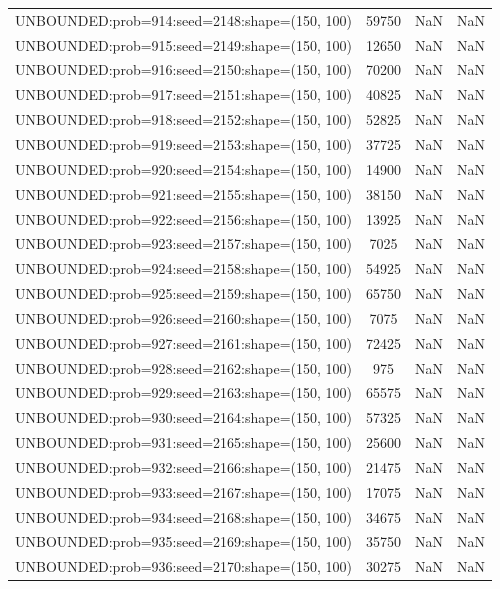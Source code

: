 \begin{longtable}{lccc}
UNBOUNDED:prob=914:seed=2148:shape=(150, 100) & 59750 &   NaN &    NaN \\
UNBOUNDED:prob=915:seed=2149:shape=(150, 100) & 12650 &   NaN &    NaN \\
UNBOUNDED:prob=916:seed=2150:shape=(150, 100) & 70200 &   NaN &    NaN \\
UNBOUNDED:prob=917:seed=2151:shape=(150, 100) & 40825 &   NaN &    NaN \\
UNBOUNDED:prob=918:seed=2152:shape=(150, 100) & 52825 &   NaN &    NaN \\
UNBOUNDED:prob=919:seed=2153:shape=(150, 100) & 37725 &   NaN &    NaN \\
UNBOUNDED:prob=920:seed=2154:shape=(150, 100) & 14900 &   NaN &    NaN \\
UNBOUNDED:prob=921:seed=2155:shape=(150, 100) & 38150 &   NaN &    NaN \\
UNBOUNDED:prob=922:seed=2156:shape=(150, 100) & 13925 &   NaN &    NaN \\
UNBOUNDED:prob=923:seed=2157:shape=(150, 100) &  7025 &   NaN &    NaN \\
UNBOUNDED:prob=924:seed=2158:shape=(150, 100) & 54925 &   NaN &    NaN \\
UNBOUNDED:prob=925:seed=2159:shape=(150, 100) & 65750 &   NaN &    NaN \\
UNBOUNDED:prob=926:seed=2160:shape=(150, 100) &  7075 &   NaN &    NaN \\
UNBOUNDED:prob=927:seed=2161:shape=(150, 100) & 72425 &   NaN &    NaN \\
UNBOUNDED:prob=928:seed=2162:shape=(150, 100) &   975 &   NaN &    NaN \\
UNBOUNDED:prob=929:seed=2163:shape=(150, 100) & 65575 &   NaN &    NaN \\
UNBOUNDED:prob=930:seed=2164:shape=(150, 100) & 57325 &   NaN &    NaN \\
UNBOUNDED:prob=931:seed=2165:shape=(150, 100) & 25600 &   NaN &    NaN \\
UNBOUNDED:prob=932:seed=2166:shape=(150, 100) & 21475 &   NaN &    NaN \\
UNBOUNDED:prob=933:seed=2167:shape=(150, 100) & 17075 &   NaN &    NaN \\
UNBOUNDED:prob=934:seed=2168:shape=(150, 100) & 34675 &   NaN &    NaN \\
UNBOUNDED:prob=935:seed=2169:shape=(150, 100) & 35750 &   NaN &    NaN \\
UNBOUNDED:prob=936:seed=2170:shape=(150, 100) & 30275 &   NaN &    NaN \\

\end{longtable}
